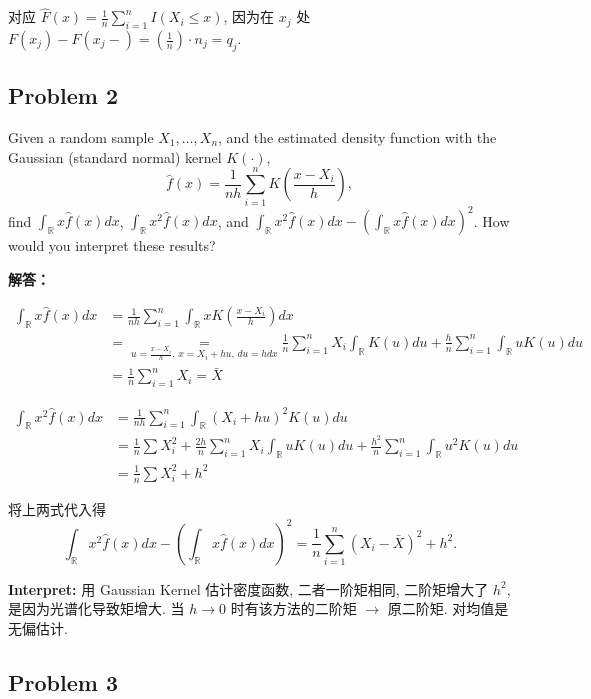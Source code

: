 对应 $\hat{F}(x) = \frac{1}{n} \sum_{i=1}^{n} I(X_i \leq x)$, 因为在 $x_j$ 处 $F(x_j) - F(x_j-) = (\frac{1}{n}) \cdot n_j = q_j$.

\subsection{Problem 2}

Given a random sample $X_1, \ldots, X_n$, and the estimated density function with the Gaussian (standard normal) kernel $K(\cdot)$,
\[
\hat{f}(x) = \frac{1}{nh} \sum_{i=1}^{n} K\left(\frac{x - X_i}{h}\right),
\]
find $\int_{\mathbb{R}} x \hat{f}(x) dx$, $\int_{\mathbb{R}} x^2 \hat{f}(x) dx$, and $\int_{\mathbb{R}} x^2 \hat{f}(x) dx - \left(\int_{\mathbb{R}} x \hat{f}(x) dx\right)^2$. How would you interpret these results?

\textbf{解答：}

\begin{align*}
\int_{\mathbb{R}} x \hat{f}(x) dx &= \frac{1}{nh} \sum_{i=1}^{n} \int_{\mathbb{R}} x K\left(\frac{x - X_i}{h}\right) dx \\
&= \underset{u = \frac{x - X_i}{h},\, x = X_i + hu,\, du = hdx}{=} \frac{1}{n} \sum_{i=1}^{n} X_i \int_{\mathbb{R}} K(u) du + \frac{h}{n} \sum_{i=1}^{n} \int_{\mathbb{R}} u K(u) du \\
&= \frac{1}{n} \sum_{i=1}^{n} X_i = \bar{X}
\end{align*}

\begin{align*}
\int_{\mathbb{R}} x^2 \hat{f}(x) dx &= \frac{1}{nh} \sum_{i=1}^{n} \int_{\mathbb{R}} (X_i + hu)^2 K(u) du \\
&= \frac{1}{n} \sum X_i^2 + \frac{2h}{n} \sum_{i=1}^{n} X_i \int_{\mathbb{R}} u K(u) du + \frac{h^2}{n} \sum_{i=1}^{n} \int_{\mathbb{R}} u^2 K(u) du \\
&= \frac{1}{n} \sum X_i^2 + h^2
\end{align*}

将上两式代入得
\[
\int_{\mathbb{R}} x^2 \hat{f}(x) dx - \left(\int_{\mathbb{R}} x \hat{f}(x) dx\right)^2 = \frac{1}{n} \sum_{i=1}^{n} (X_i - \bar{X})^2 + h^2.
\]

\textbf{Interpret:} 用 Gaussian Kernel 估计密度函数, 二者一阶矩相同, 二阶矩增大了 $h^2$, 是因为光谱化导致矩增大. 当 $h \to 0$ 时有该方法的二阶矩 $\to$ 原二阶矩. 对均值是无偏估计.

\subsection{Problem 3}

